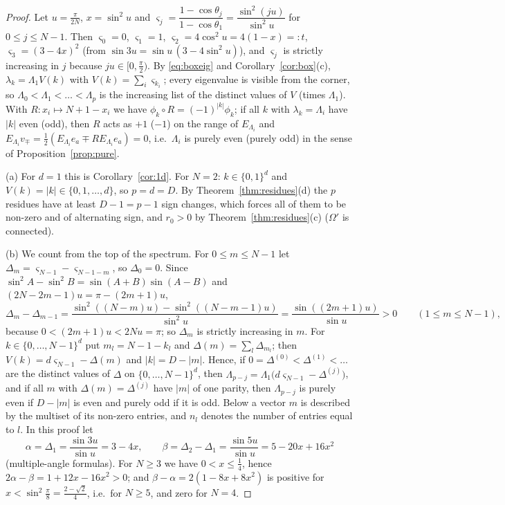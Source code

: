 \documentclass[11pt,a4paper]{article}
\theoremstyle{plain}
\theoremstyle{definition}
\numberwithin{equation}{section}
\begin{document}
\begin{proof}
Let $u=\frac{\pi}{2N}$, $x=\sin^2u$ and $\varsigma_j=\dfrac{1-\cos\theta_j}{1-\cos\theta_1}=\dfrac{\sin^2(ju)}{\sin^2u}$ for $0\le j\le N-1$. Then $\varsigma_0=0$, $\varsigma_1=1$, $\varsigma_2=4\cos^2u=4(1-x)=:t$, $\varsigma_3=(3-4x)^2$ (from $\sin3u=\sin u\,(3-4\sin^2u)$), and $\varsigma_j$ is strictly increasing in $j$ because $ju\in[0,\frac\pi2)$. By \eqref{eq:boxeig} and Corollary~\ref{cor:box}(c), $\lambda_k=\Lambda_1V(k)$ with $V(k)=\sum_i\varsigma_{k_i}$; every eigenvalue is visible from the corner, so $\Lambda_0<\Lambda_1<\dots<\Lambda_p$ is the increasing list of the distinct values of $V$ (times $\Lambda_1$). With $R:x_i\mapsto N+1-x_i$ we have $\phi_k\circ R=(-1)^{|k|}\phi_k$; if all $k$ with $\lambda_k=\Lambda_i$ have $|k|$ even (odd), then $R$ acts as $+1$ ($-1$) on the range of $E_{\Lambda_i}$ and $E_{\Lambda_i}v_\mp=\frac12(E_{\Lambda_i}e_a\mp RE_{\Lambda_i}e_a)=0$, i.e.\ $\Lambda_i$ is purely even (purely odd) in the sense of Proposition~\ref{prop:pure}.

(a) For $d=1$ this is Corollary~\ref{cor:1d}. For $N=2$: $k\in\{0,1\}^d$ and $V(k)=|k|\in\{0,1,\dots,d\}$, so $p=d=D$. By Theorem~\ref{thm:residues}(d) the $p$ residues have at least $D-1=p-1$ sign changes, which forces all of them to be non-zero and of alternating sign, and $r_0>0$ by Theorem~\ref{thm:residues}(c) ($\Omega'$ is connected).

(b) We count from the top of the spectrum. For $0\le m\le N-1$ let $\Delta_m=\varsigma_{N-1}-\varsigma_{N-1-m}$, so $\Delta_0=0$. Since $\sin^2A-\sin^2B=\sin(A+B)\sin(A-B)$ and $(2N-2m-1)u=\pi-(2m+1)u$,
\begin{equation}\label{eq:drops}
\Delta_m-\Delta_{m-1}=\frac{\sin^2((N-m)u)-\sin^2((N-m-1)u)}{\sin^2u}=\frac{\sin((2m+1)u)}{\sin u}>0\qquad(1\le m\le N-1),
\end{equation}
because $0<(2m+1)u<2Nu=\pi$; so $\Delta_m$ is strictly increasing in $m$. For $k\in\{0,\dots,N-1\}^d$ put $m_l=N-1-k_l$ and $\Delta(m)=\sum_l\Delta_{m_l}$; then $V(k)=d\varsigma_{N-1}-\Delta(m)$ and $|k|=D-|m|$. Hence, if $0=\Delta^{(0)}<\Delta^{(1)}<\dots$ are the distinct values of $\Delta$ on $\{0,\dots,N-1\}^d$, then $\Lambda_{p-j}=\Lambda_1\big(d\varsigma_{N-1}-\Delta^{(j)}\big)$, and if all $m$ with $\Delta(m)=\Delta^{(j)}$ have $|m|$ of one parity, then $\Lambda_{p-j}$ is purely even if $D-|m|$ is even and purely odd if it is odd. Below a vector $m$ is described by the multiset of its non-zero entries, and $n_l$ denotes the number of entries equal to $l$. In this proof let
\[
\alpha=\Delta_1=\frac{\sin3u}{\sin u}=3-4x,\qquad\beta=\Delta_2-\Delta_1=\frac{\sin5u}{\sin u}=5-20x+16x^2
\]
(multiple-angle formulas). For $N\ge3$ we have $0<x\le\frac14$, hence $2\alpha-\beta=1+12x-16x^2>0$; and $\beta-\alpha=2(1-8x+8x^2)$ is positive for $x<\sin^2\frac\pi8=\frac{2-\sqrt2}{4}$, i.e.\ for $N\ge5$, and zero for $N=4$.


\end{proof}
\end{document}
